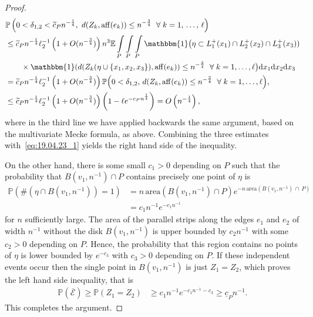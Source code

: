 \documentclass[AHL,Unicode,longabstracts,published]{cedram}
\newcommand{\ind}{\mathbbm{1}}
\newcommand{\bbE}{\mathbb{E}}
\newcommand{\bbP}{\mathbb{P}}
\newcommand{\clE}{\mathcal{E}}
\newcommand{\area}{\mathrm{area}}
\newcommand{\aff}{\mathrm{aff}}
\let\oldtilde\tilde
\renewcommand*{\tilde}[1]{\mathchoice{\widetilde{#1}}{\widetilde{#1}}{\oldtilde{#1}}{\oldtilde{#1}}}
\let\oldforall\forall
\renewcommand*{\forall}{\mathrel{\oldforall}}
\begin{document}
\begin{proof}
\begin{align*}
&\bbP \left(0<\delta_{1,2} < \tilde c_P n^{- \frac 14}, \ d(Z_k, \aff(e_k)) \leq n^{- \frac 34} \ \forall k=1,\,\ldots,\,\ell \right)
\\ & \leq
\tilde c_P n^{- \frac 14} \ell_2^{-1} \left(1+O(n^{- \frac 34})\right) n^3 \bbE \int\limits_{P}\int\limits_{P}\int\limits_{P}
\ind \big(\eta \subset L_1^+(x_1) \cap L_2^+ (x_2)\cap L_3^+ (x_3))\\
&\qquad \times
\ind(d(Z_k(\eta\cup\{x_1,x_2,x_3\}), \aff(e_k)) \leq n^{- \frac 34} \ \forall k=1,\ldots,\ell \big)\mathrm{d} x_1\mathrm{d} x_2\mathrm{d} x_3
\\ & =
\tilde c_P n^{- \frac 14} \ell_2^{-1} \left(1+O(n^{- \frac 34})\right) \bbP\Big(0<\delta_{1,2},\, d(Z_k, \aff(e_k)) \leq n^{- \frac 34} \ \forall k=1,\ldots,\ell \Big),
\\ & \leq
\tilde c_P n^{- \frac 14} \ell_2^{-1} \left(1+O(n^{- \frac 34})\right) \left(1- \ell e^{-c_P n^{\frac 14}}\right) = O\left(n^{- \frac 14}\right),
\end{align*}
where in the third line we have applied backwards the same argument, based on the multivariate Mecke formula, as above. Combining the three estimates with~\eqref{eq:19.04.23_1} yields the right hand side of the inequality.

On the other hand, there is some small $c_1>0$ depending on $P$ such that the probability that $B(v_1, n^{-1}) \cap P$ contains precisely one point of $\eta$ is
\begin{align*}
\bbP\left(\#(\eta \cap B(v_1, n^{- 1})) = 1\right) &= n\, {\area}\left(B(v_1, n^{- 1}) \cap P\right) e^{- n\, {\area}\left(B\left(v_1, n^{- 1}\right)\,\cap\,P\right) } \\
&= c_1 n^{- 1} e^{-c_1 n^{- 1}}
\end{align*}
for $n$ sufficiently large. The area of the parallel strips along the edges $e_1$ and $e_{2}$ of width $n^{- 1}$ without the disk $B(v_1, n^{- 1})$ is upper bounded by $c_2 n^{-1}$ with some $c_2>0 $ depending on $P$. Hence, the probability that this region contains no points of $\eta$ is lower bounded by $ e^{- c_3} $ with $c_3>0$ depending on $P$. If these independent events occur then the single point in $B(v_1, n^{- 1})$ is just $Z_1=Z_2$, which proves the left hand side inequality, that is
\begin{align*}
\bbP(\overline{\clE})
\geq
\bbP(Z_1=Z_{2}) & \geq c_1 n^{- 1} e^{-c_1 n^{- 1} -c_3}
\geq \underline{c}_P n^{- 1}.
\end{align*}
This completes the argument.
\end{proof}
\end{document}

